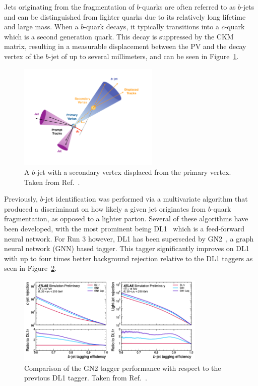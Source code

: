 Jets originating from the fragmentation of $b$-quarks are often referred to as $b$-jets and can be distinguished from lighter quarks due to its relatively long lifetime and large mass. When a $b$-quark decays, it typically transitions into a $c$-quark which is a second generation quark. This decay is suppressed by the CKM matrix, resulting in a measurable displacement between the PV and the decay vertex of the $b$-jet of up to several millimeters, and can be seen in Figure~\ref{fig:reco_btagged_jet}.

\begin{figure}[htbp]
  \centering
  \includegraphics[width=0.6\textwidth]{figures/reco/reco_btagged_jet.png}
  \caption{A $b$-jet with a secondary vertex displaced from the primary vertex. Taken from Ref.~\cite{ATLAS:2021piz}.}\label{fig:reco_btagged_jet}
\end{figure}

Previously, $b$-jet identification was performed via a multivariate algorithm that produced a discriminant on how likely a given jet originates from $b$-quark fragmentation, as opposed to a lighter parton. Several of these algorithms have been developed, with the most prominent being DL1~\cite{dl1_paper} which is a feed-forward neural network. For Run 3 however, DL1 has been superseded by GN2~\cite{Duperrin:2023elp}, a graph neural network (GNN) based tagger. This tagger significantly improves on DL1 with up to four times better background rejection relative to the DL1 taggers as seen in Figure~\ref{fig:reco_gn2_performance}.

\begin{figure}[htbp]
  \centering
  \includegraphics[width=0.8\textwidth]{figures/reco/reco_gn2_performance.png}
  \caption{Comparison of the GN2 tagger performance with respect to the previous DL1 tagger. Taken from Ref.~\cite{Duperrin:2023elp}.}\label{fig:reco_gn2_performance}
\end{figure}

